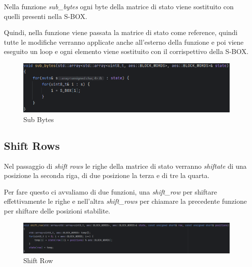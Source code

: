  

\textsf{\small Nella funzione \emph{sub\_bytes} ogni byte della matrice di stato viene sostituito con quelli presenti nella S-BOX.}

 

\textsf{\small Quindi, nella funzione viene passata la matrice di stato come reference, quindi tutte le modifiche verranno applicate anche all'esterno della funzione e poi viene eseguito un loop e ogni elemento viene sostituito con il corrispettivo della S-BOX.}

\begin{figure}[H]
	\centering
	\includegraphics[width=1\textwidth, height=1\textheight, keepaspectratio]{./images/code/cpp/encryption/sub_bytes.PNG}
	\caption{Sub Bytes}
	\label{fig:sub_bytes}
\end{figure}

\subsection{Shift Rows}


\textsf{\small Nel passaggio di \emph{shift rows} le righe della matrice di stato verranno \emph{shiftate} di una posizione la seconda riga, di due posizione la terza e di tre la quarta.}


\textsf{\small Per fare questo ci avvaliamo di due funzioni, una \emph{shift\_row} per shiftare effettivamente le righe e nell'altra \emph{shift\_rows} per chiamare la precedente funzione per shiftare delle posizioni stabilite.}


\begin{figure}[H]
	\centering
	\includegraphics[width=1\textwidth, height=1\textheight, keepaspectratio]{./images/code/cpp/encryption/shift_row.PNG}
	\caption{Shift Row}
	\label{fig:shift_row}
\end{figure}

